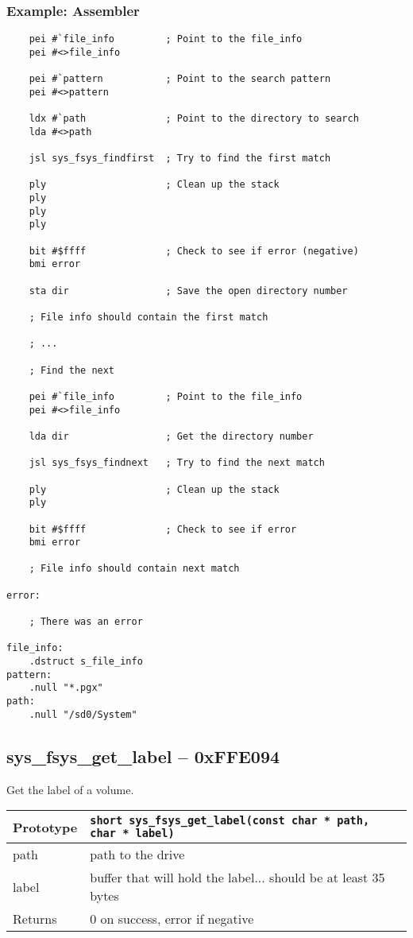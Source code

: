 \subsubsection*{Example: Assembler}
\begin{verbatim}
    pei #`file_info         ; Point to the file_info 
    pei #<>file_info

    pei #`pattern           ; Point to the search pattern
    pei #<>pattern

    ldx #`path              ; Point to the directory to search
    lda #<>path

    jsl sys_fsys_findfirst  ; Try to find the first match

    ply                     ; Clean up the stack
    ply
    ply
    ply

    bit #$ffff              ; Check to see if error (negative)
    bmi error

    sta dir                 ; Save the open directory number

    ; File info should contain the first match

    ; ...

    ; Find the next

    pei #`file_info         ; Point to the file_info
    pei #<>file_info

    lda dir                 ; Get the directory number

    jsl sys_fsys_findnext   ; Try to find the next match

    ply                     ; Clean up the stack
    ply

    bit #$ffff              ; Check to see if error
    bmi error

    ; File info should contain next match

error:

    ; There was an error

file_info:
    .dstruct s_file_info
pattern:
    .null "*.pgx"
path:
    .null "/sd0/System"
\end{verbatim}


\subsection*{sys\_fsys\_get\_label -- 0xFFE094}
Get the label of a volume.

\bigskip

\begin{tabular}{|l||l|} \hline
Prototype & \lstinline!short sys_fsys_get_label(const char * path, char * label)! \\ \hline
path & path to the drive \\ \hline
label & buffer that will hold the label... should be at least 35 bytes \\ \hline
Returns & 0 on success, error if negative \\ \hline
\end{tabular}

